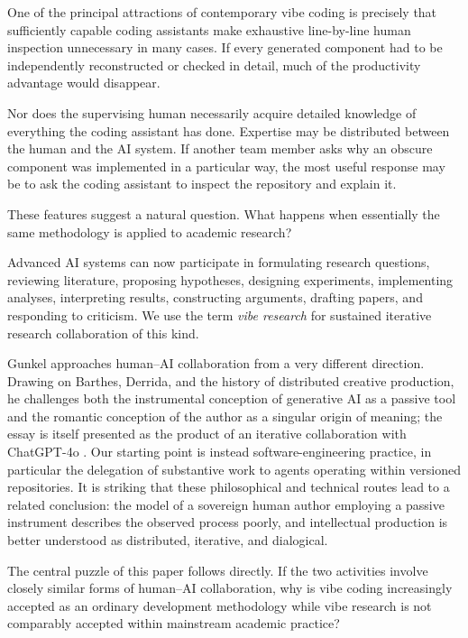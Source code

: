 \documentclass[12pt]{article}
\begin{document}
One of the principal attractions of contemporary vibe coding is precisely that sufficiently capable coding assistants make exhaustive line-by-line human inspection unnecessary in many cases. If every generated component had to be independently reconstructed or checked in detail, much of the productivity advantage would disappear.

Nor does the supervising human necessarily acquire detailed knowledge of everything the coding assistant has done. Expertise may be distributed between the human and the AI system. If another team member asks why an obscure component was implemented in a particular way, the most useful response may be to ask the coding assistant to inspect the repository and explain it.

These features suggest a natural question. What happens when essentially the same methodology is applied to academic research?

Advanced AI systems can now participate in formulating research questions, reviewing literature, proposing hypotheses, designing experiments, implementing analyses, interpreting results, constructing arguments, drafting papers, and responding to criticism. We use the term \emph{vibe research} for sustained iterative research collaboration of this kind.

Gunkel approaches human--AI collaboration from a very different direction. Drawing on Barthes, Derrida, and the history of distributed creative production, he challenges both the instrumental conception of generative AI as a passive tool and the romantic conception of the author as a singular origin of meaning; the essay is itself presented as the product of an iterative collaboration with ChatGPT-4o \citep{gunkel2025prompted}. Our starting point is instead software-engineering practice, in particular the delegation of substantive work to agents operating within versioned repositories. It is striking that these philosophical and technical routes lead to a related conclusion: the model of a sovereign human author employing a passive instrument describes the observed process poorly, and intellectual production is better understood as distributed, iterative, and dialogical.

The central puzzle of this paper follows directly. If the two activities involve closely similar forms of human--AI collaboration, why is vibe coding increasingly accepted as an ordinary development methodology while vibe research is not comparably accepted within mainstream academic practice?
\end{document}
